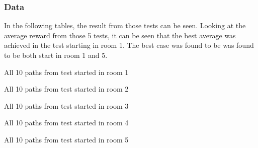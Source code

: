\documentclass[../Head/Main.tex]{subfiles}
\begin{document}
\subsubsection*{Data}
In the following tables, the result from those tests can be seen. Looking at the average reward from those 5 tests, it can be seen that the best average was achieved in the test starting in room 1. The best case was found to be was found to be both start in room 1 and 5.\\
\begin{minipage}[c]{0.49\textwidth}
	\begin{table}[H]
		\centering
		
		\caption{All 10 paths from test started in room 1}
		\vspace{-10pt}
		\label{tab:test_room_1}
	\end{table}
\end{minipage}
\hfill
\begin{minipage}[c]{0.49\textwidth}
	\begin{table}[H]
		\centering
		
		\caption{All 10 paths from test started in room 2}
		\vspace{-10pt}
		\label{tab:test_room_2}
	\end{table}
\end{minipage}

\begin{minipage}[c]{0.49\textwidth}
	\begin{table}[H]
		\centering
		
		\caption{All 10 paths from test started in room 3}
		\label{tab:test_room_3}
	\end{table}
\end{minipage}
\hfill
\begin{minipage}[c]{0.49\textwidth}
	\begin{table}[H]
		\centering
		
		\caption{All 10 paths from test started in room 4}
		\label{tab:test_room_4}
	\end{table}
\end{minipage} 

\begin{table}[H]
	\centering
	
	\caption{All 10 paths from test started in room 5}
	\label{tab:test_room_5}
\end{table}
\end{document}
